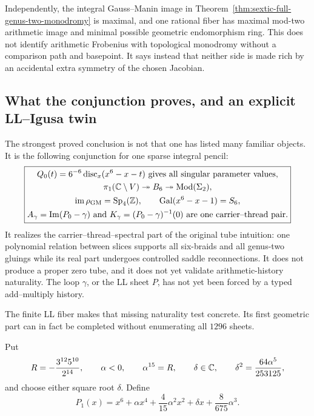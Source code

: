Independently, the integral Gauss--Manin image in
Theorem~\ref{thm:sextic-full-genus-two-monodromy} is maximal, and one
rational fiber has maximal mod-two arithmetic image and minimal possible
geometric endomorphism ring.  This does not identify arithmetic Frobenius with
topological monodromy without a comparison path and basepoint.  It says instead
that neither side is made rich by an accidental extra symmetry of the chosen
Jacobian.

\subsection{What the conjunction proves, and an explicit LL--Igusa twin}

The strongest proved conclusion is not that one has listed many familiar
objects.  It is the following conjunction for one sparse integral pencil:
\begin{equation}
 \boxed{
 \begin{gathered}
 Q_0(t)=6^{-6}\operatorname{disc}_x(x^6-x-t)
 \text{ gives all singular parameter values},\\
 \pi_1(\mathbb{C}\setminus V)\twoheadrightarrow B_6
 \twoheadrightarrow\operatorname{Mod}(\Sigma_2),\\
 \operatorname{im}\rho_{\mathrm{GM}}=\operatorname{Sp}_4(\mathbb{Z}),
 \qquad
 \operatorname{Gal}(x^6-x-1)=S_6,\\
 A_\gamma=\operatorname{Im}(P_0-\gamma)
 \text{ and }K_\gamma=(P_0-\gamma)^{-1}(0)
 \text{ are one carrier--thread pair.}
 \end{gathered}}
 \label{eq:sextic-conjunction}
\end{equation}
It realizes the carrier--thread--spectral part of the original tube intuition:
one polynomial relation between slices supports all six-braids and all
genus-two gluings while its real part undergoes controlled saddle
reconnections.  It does not produce a proper zero tube, and it does not yet
validate arithmetic-history naturality.  The loop $\gamma$, or the LL sheet
$P$, has not yet been forced by a typed add--multiply history.

The finite LL fiber makes that missing naturality test concrete.  Its first
geometric part can in fact be completed without enumerating all $1296$ sheets.

Put
\begin{equation}
 R=-\frac{3^{12}5^{10}}{2^{14}},
 \qquad
 \alpha<0,
 \qquad
 \alpha^{15}=R,
 \qquad
 \delta\in\mathbb{C},
 \qquad
 \delta^2=\frac{64\alpha^5}{253125},
 \label{eq:explicit-ll-twin-parameters}
\end{equation}
and choose either square root $\delta$.  Define
\begin{equation}
 P_1(x)=x^6+\alpha x^4+\frac4{15}\alpha^2x^2
       +\delta x+\frac8{675}\alpha^3.
 \label{eq:explicit-ll-twin-polynomial}
\end{equation}

